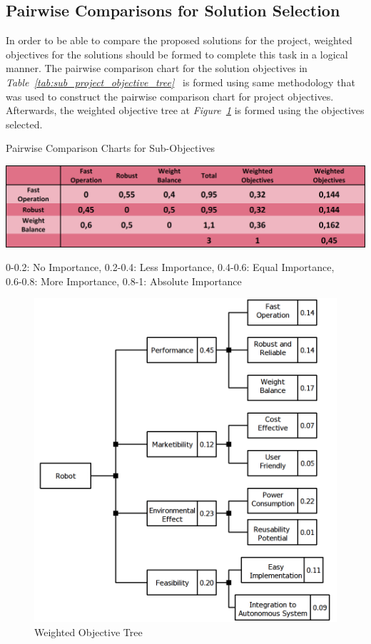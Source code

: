 \documentclass[a4paper,12pt]{article}
\begin{document}
	
	\subsection{Pairwise Comparisons for Solution Selection}	
	
		In order to be able to compare the proposed solutions for the project, weighted objectives for the solutions should be formed to complete this task in a logical manner. The pairwise comparison chart for the solution objectives in \textit{Table~\ref{tab:sub_project_objective_tree}\ } is formed using same methodology that was used to construct the pairwise comparison chart for project objectives. Afterwards, the weighted objective tree at \textit{Figure~\ref{fig:product_tree}} is formed using the objectives selected.
	
	
	\begin{table}[H]
		\centering
		\caption{\label{tab:sub_project_objective_tree}Pairwise Comparison Charts for Sub-Objectives}\vspace{-.2cm}
		\includegraphics[width=\textwidth,height=\textheight,keepaspectratio]{images/proje_objective_tree_2a} 
	\vspace*{-.9cm}	\begin{center}
		{\small 0-0.2: No Importance, 0.2-0.4: Less Importance, 0.4-0.6: Equal Importance,\\ 0.6-0.8: More Importance, 0.8-1: Absolute Importance }	
		\end{center}
	\end{table}	\vspace*{-.5cm}
	
	\begin{figure}[H]
		\centering
		\includegraphics[width=.7\textwidth,center]{objective-tree/objective-tree} 
		\caption{\label{fig:product_tree}Weighted Objective Tree}
	\end{figure}
	
\end{document}
